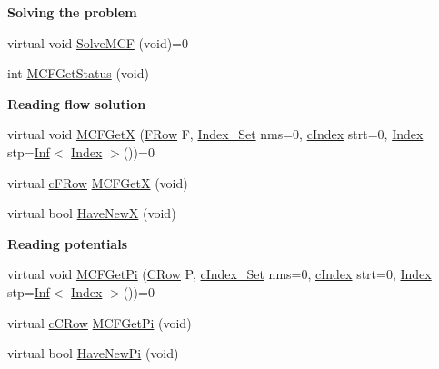 \begin{Indent}\textbf{ Solving the problem}\par
\begin{DoxyCompactItemize}
\item 
virtual void \mbox{\hyperlink{class_m_c_f_class_ac0d96429d896a2d878a5f057535ab1ee}{Solve\+M\+CF}} (void)=0
\item 
int \mbox{\hyperlink{class_m_c_f_class_a333e27ad7a73779b096cb70829cbe8be}{M\+C\+F\+Get\+Status}} (void)
\end{DoxyCompactItemize}
\end{Indent}
\begin{Indent}\textbf{ Reading flow solution}\par
\begin{DoxyCompactItemize}
\item 
virtual void \mbox{\hyperlink{class_m_c_f_class_a884f1180138ddf3df909347b1c85428c}{M\+C\+F\+GetX}} (\mbox{\hyperlink{class_m_c_f_class_a9dae1f1a39c208ce3c2b337cd5bb3d00}{F\+Row}} F, \mbox{\hyperlink{class_m_c_f_class_ace3388eb329ff0551a0b86b6c67e33d8}{Index\+\_\+\+Set}} nms=0, \mbox{\hyperlink{class_m_c_f_class_a76aaabb20535c51a2752b93f6c38fe54}{c\+Index}} strt=0, \mbox{\hyperlink{class_m_c_f_class_ad53d6229d7ec28555a9c9c2fd9abf773}{Index}} stp=\mbox{\hyperlink{class_o_p_ttypes__di__unipi__it_1_1_inf}{Inf}}$<$ \mbox{\hyperlink{class_m_c_f_class_ad53d6229d7ec28555a9c9c2fd9abf773}{Index}} $>$())=0
\item 
virtual \mbox{\hyperlink{class_m_c_f_class_ad325f3193dbba0ddef1da4e72d29eda6}{c\+F\+Row}} \mbox{\hyperlink{class_m_c_f_class_a4eb307e0707adaef99bb0e08c9e10eb8}{M\+C\+F\+GetX}} (void)
\item 
virtual bool \mbox{\hyperlink{class_m_c_f_class_a7a4966a98c7ffa909057064beb4507a5}{Have\+NewX}} (void)
\end{DoxyCompactItemize}
\end{Indent}
\begin{Indent}\textbf{ Reading potentials}\par
\begin{DoxyCompactItemize}
\item 
virtual void \mbox{\hyperlink{class_m_c_f_class_a8c573c04800332c86ea31aeb80bbd7b1}{M\+C\+F\+Get\+Pi}} (\mbox{\hyperlink{class_m_c_f_class_a62409402be4e4b301e1a568f99f877be}{C\+Row}} P, \mbox{\hyperlink{class_m_c_f_class_a81575b2d4e4d5636b17170432150ae69}{c\+Index\+\_\+\+Set}} nms=0, \mbox{\hyperlink{class_m_c_f_class_a76aaabb20535c51a2752b93f6c38fe54}{c\+Index}} strt=0, \mbox{\hyperlink{class_m_c_f_class_ad53d6229d7ec28555a9c9c2fd9abf773}{Index}} stp=\mbox{\hyperlink{class_o_p_ttypes__di__unipi__it_1_1_inf}{Inf}}$<$ \mbox{\hyperlink{class_m_c_f_class_ad53d6229d7ec28555a9c9c2fd9abf773}{Index}} $>$())=0
\item 
virtual \mbox{\hyperlink{class_m_c_f_class_ab700102e9ba8bb6015be6818d4e99097}{c\+C\+Row}} \mbox{\hyperlink{class_m_c_f_class_a8f1a95d5c707f83ffc6aecba1e7e0e10}{M\+C\+F\+Get\+Pi}} (void)
\item 
virtual bool \mbox{\hyperlink{class_m_c_f_class_a87b2b6516a7874ac55145312bd2d55bb}{Have\+New\+Pi}} (void)
\end{DoxyCompactItemize}
\end{Indent}
